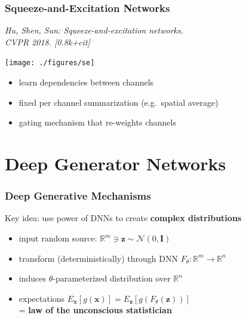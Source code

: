 \documentclass[compress]{beamer}
\newcommand{\x}{{\mathbf x}}
\newcommand{\z}{{\mathbf z}}
\newcommand{\E}{{E}}
\newcommand{\textbblue}[1]{{\bf\color{Blue} #1}}
\newcommand{\is}[1]{\setlength{\itemsep}{#1}}
\renewcommand{\Re}{{\mathbb R}}
\begin{document}
\begin{frame} \frametitle{Squeeze-and-Excitation Networks}
{\small \textit{Hu, Shen, Sun: Squeeze-and-excitation networks. \\CVPR 2018. [0.8k+cit]}}\\[1mm]

\begin{center}
\texttt{[image: ./figures/se]}
\end{center}


\begin{itemize} \is{2mm}
\item learn dependencies between channels 
\item fixed per channel summarization (e.g.~spatial average)
\item gating mechanism that re-weights channels
\end{itemize}
\end{frame}



\section{Deep Generator Networks}
\frame{\sectionpage}


\begin{frame}
\frametitle{
Deep Generative Mechanisms
}
Key idea: use power of DNNs to create \textbblue{complex distributions}\\[4mm]
\begin{itemize}\is{4mm}
\item input random source: $\Re^m \ni \z \sim \mathcal N(0,\mathbf I)$ 
\item transform (deterministically) through DNN $F_\theta: \Re^m \to \Re^n$ 
\item induces $\theta$-parameterized distribution over $\Re^n$
\item expectations $\E_\x[g(\x)] = \E_\z\left[ g(F_\theta(\z)) \right]$ \\[1mm] = \textbblue{law of the unconscious statistician}
\end{itemize}
\end{frame}
\end{document}
